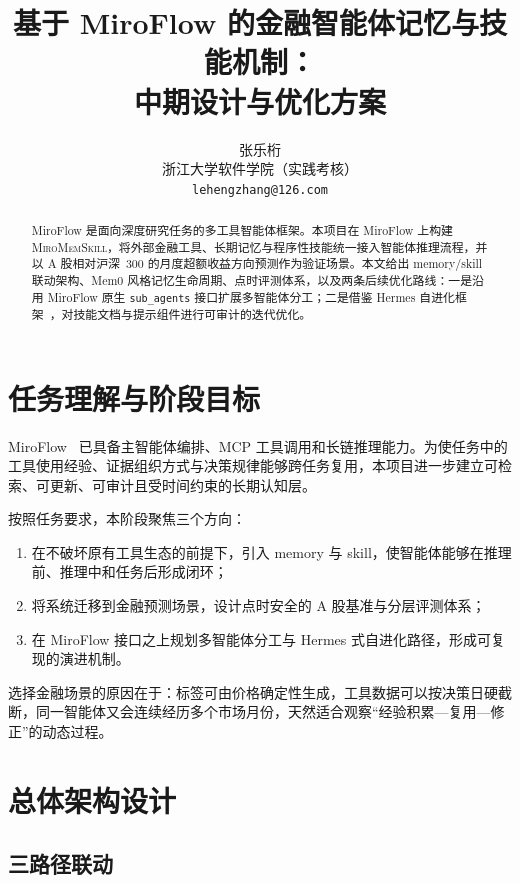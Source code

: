 \documentclass[11pt]{article}
\title{基于 MiroFlow 的金融智能体记忆与技能机制：\\中期设计与优化方案}
\author{张乐桁 \\
  浙江大学软件学院（实践考核） \\
  \texttt{lehengzhang@126.com}}
\newcommand{\system}{\textsc{MiroMemSkill}}
\begin{document}
\maketitle

\begin{abstract}
MiroFlow 是面向深度研究任务的多工具智能体框架。本项目在 MiroFlow 上构建 \system，将外部金融工具、长期记忆与程序性技能统一接入智能体推理流程，并以 A 股相对沪深~300 的月度超额收益方向预测作为验证场景。本文给出 memory/skill 联动架构、Mem0 风格记忆生命周期、点时评测体系，以及两条后续优化路线：一是沿用 MiroFlow 原生 \texttt{sub\_agents} 接口扩展多智能体分工；二是借鉴 Hermes 自进化框架~\citep{hermes2025}，对技能文档与提示组件进行可审计的迭代优化。
\end{abstract}

\section{任务理解与阶段目标}

MiroFlow~\citep{miroflow2025} 已具备主智能体编排、MCP 工具调用和长链推理能力。为使任务中的工具使用经验、证据组织方式与决策规律能够跨任务复用，本项目进一步建立可检索、可更新、可审计且受时间约束的长期认知层。

按照任务要求，本阶段聚焦三个方向：
\begin{enumerate}
    \item 在不破坏原有工具生态的前提下，引入 memory 与 skill，使智能体能够在推理前、推理中和任务后形成闭环；
    \item 将系统迁移到金融预测场景，设计点时安全的 A 股基准与分层评测体系；
    \item 在 MiroFlow 接口之上规划多智能体分工与 Hermes 式自进化路径，形成可复现的演进机制。
\end{enumerate}

选择金融场景的原因在于：标签可由价格确定性生成，工具数据可以按决策日硬截断，同一智能体又会连续经历多个市场月份，天然适合观察“经验积累---复用---修正”的动态过程。

\section{总体架构设计}

\subsection{三路径联动}
\end{document}
